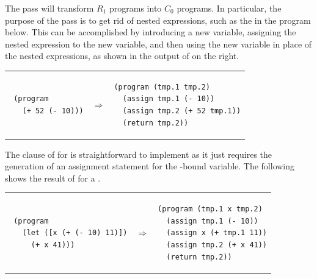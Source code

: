 \documentclass[11pt]{book}
\begin{document}
The  pass will transform $R_1$ programs into $C_0$
programs. In particular, the purpose of the  pass is to
get rid of nested expressions, such as the  in the program
below. This can be accomplished by introducing a new variable,
assigning the nested expression to the new variable, and then using
the new variable in place of the nested expressions, as shown in the
output of  on the right.\\
\begin{tabular}{lll}
\begin{minipage}{0.4\textwidth}
\begin{lstlisting}
 (program
   (+ 52 (- 10)))
\end{lstlisting}
\end{minipage}
&
$\Rightarrow$
&
\begin{minipage}{0.4\textwidth}
\begin{lstlisting}
(program (tmp.1 tmp.2)
  (assign tmp.1 (- 10))
  (assign tmp.2 (+ 52 tmp.1))
  (return tmp.2))
\end{lstlisting}
\end{minipage}
\end{tabular}

The clause of  for  is straightforward to
implement as it just requires the generation of an assignment
statement for the -bound variable. The following shows the
result of  for a . \\
\begin{tabular}{lll}
\begin{minipage}{0.4\textwidth}
\begin{lstlisting}
 (program
   (let ([x (+ (- 10) 11)])
     (+ x 41)))
\end{lstlisting}
\end{minipage}
&
$\Rightarrow$
&
\begin{minipage}{0.4\textwidth}
\begin{lstlisting}
(program (tmp.1 x tmp.2)
  (assign tmp.1 (- 10))
  (assign x (+ tmp.1 11))
  (assign tmp.2 (+ x 41))
  (return tmp.2))
\end{lstlisting}
\end{minipage}
\end{tabular}
\end{document}
